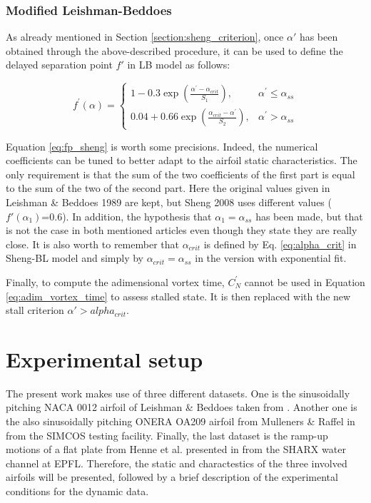 \subsubsection{Modified Leishman-Beddoes}

As already mentioned in Section \ref{section:sheng_criterion}, once $\alpha'$ has been obtained through the above-described procedure, it can be used to define the delayed separation point $f'$ in LB model as follows: 

\begin{equation}
	f^{\prime}(\alpha)=\left\{\begin{array}{ll}
		1-0.3 \exp \left(\frac{\alpha^{\prime}-\alpha_{crit}}{S_{1}}\right), & \alpha^{\prime} \leq \alpha_{ss} \\
		0.04+0.66 \exp \left(\frac{\alpha_{crit}-\alpha^{\prime}}{S_{2}}\right), & \alpha^{\prime}>\alpha_{ss}
		\end{array}\right.
		\label{eq:fp_sheng}
\end{equation}

Equation \eqref{eq:fp_sheng} is worth some precisions. Indeed, the numerical coefficients can be tuned to better adapt to the airfoil static characteristics. The only requirement is that the sum of the two coefficients of the first part is equal to the sum of the two of the second part. Here the original values given in Leishman \& Beddoes 1989 \cite{leishman_semi-empirical_1989} are kept, but Sheng 2008 \cite{sheng_modified_2008} uses different values ($f'(\alpha_1)$=0.6). In addition, the hypothesis that $\alpha_1 = \alpha_{ss}$ has been made, but that is not the case in both mentioned articles even though they state they are really close. It is also worth to remember that $\alpha_{crit}$ is defined by Eq. \eqref{eq:alpha_crit} in Sheng-BL model and simply by $\alpha_{crit} = \alpha_{ss}$ in the version with exponential fit. 

Finally, to compute the adimensional vortex time, $C_N^{\prime}$ cannot be used in Equation \eqref{eq:adim_vortex_time} to assess stalled state. It is then replaced with the new stall criterion $\alpha'>alpha_{crit}$.

\section{Experimental setup}


The present work makes use of three different datasets. One is the sinusoidally pitching NACA 0012 airfoil of Leishman \& Beddoes taken from \cite{leishman_semi-empirical_1989}. Another one is the also sinusoidally pitching ONERA OA209 airfoil from Mulleners \& Raffel in \cite{mulleners_dynamic_2013} from the SIMCOS testing facility. Finally, the last dataset is the ramp-up motions of a flat plate from Henne et al. presented in \cite{henne_dynamic_2018} from the SHARX water channel at EPFL. Therefore, the static and charactestics of the three involved airfoils will be presented, followed by a brief description of the experimental conditions for the dynamic data.

